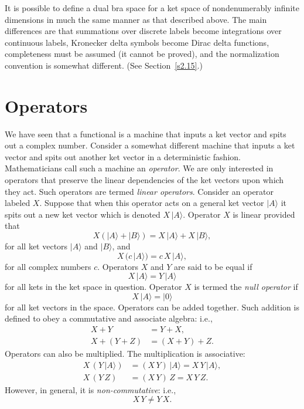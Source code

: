 It is possible to define a dual bra space for a ket space of nondenumerably
infinite dimensions in much the same manner as that described above. The
main differences are that summations over discrete labels become integrations
over continuous labels, Kronecker delta symbols become Dirac delta functions, 
completeness must be assumed (it cannot be proved), and the normalization convention 
is somewhat different. (See Section~\ref{s2.15}.)

\section{Operators}
We have seen that a functional is a machine that inputs a ket vector and
spits out a complex number. Consider a 
somewhat different machine that  inputs a ket
vector and spits out another ket vector in a deterministic fashion. Mathematicians
call such a machine an {\em operator}. We are only interested in operators
that preserve the linear dependencies of the ket vectors upon which
they act. Such operators are termed {\em linear operators}. Consider an operator
labeled $X$. Suppose that when this operator acts on a general ket vector
$|A \rangle$ it spits out a new ket vector which is denoted
$X\,|A\rangle$. Operator $X$ is linear provided that
\begin{equation}
X \left(|A\rangle + |B \rangle\right) = X\,|A\rangle + X\,|B \rangle,
\end{equation}
for all ket vectors $|A\rangle$ and $|B \rangle$, and
\begin{equation}
X\,(c\, |A\rangle) = c\, X \,|A\rangle,
\end{equation}
for all complex numbers $c$. Operators $X$ and $Y$ are said to be equal
if
\begin{equation}
X\, |A\rangle = Y\,|A\rangle
\end{equation}
for all kets in the ket space in question. Operator $X$ is termed the
{\em null operator}\/
if
\begin{equation}
X \, |A\rangle = |0\rangle
\end{equation}
for all ket vectors in the space. Operators can be added together. Such addition 
is defined to obey a commutative and associate algebra: i.e., 
\begin{align}
X + Y &= Y + X,\\[0.5ex]
X + (Y + Z) &= (X + Y ) + Z.
\end{align}
Operators can also be multiplied. The multiplication is associative:
\begin{align}
X\,(Y\,|A\rangle)& = (X\,Y)\, |A\rangle = X\,Y\,| A \rangle,\\[0.5ex]
X\,(Y\,Z)& = (X\,Y)\, Z = X\,Y\,Z.
\end{align}
However, in general, it is {\em non-commutative}: i.e., 
\begin{equation}
X\,Y \neq Y\,X.
\end{equation}

